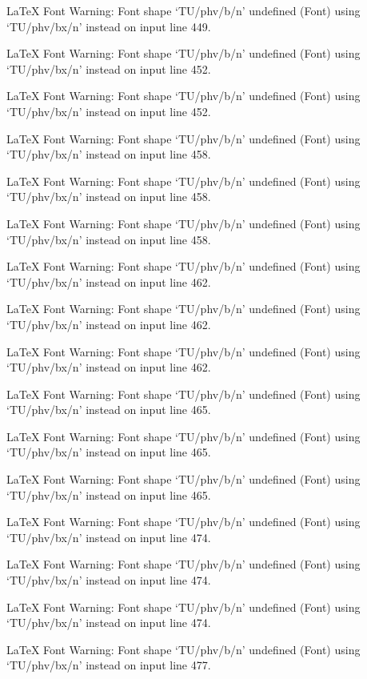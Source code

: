 LaTeX Font Warning: Font shape `TU/phv/b/n' undefined
(Font)              using `TU/phv/bx/n' instead on input line 449.


LaTeX Font Warning: Font shape `TU/phv/b/n' undefined
(Font)              using `TU/phv/bx/n' instead on input line 452.


LaTeX Font Warning: Font shape `TU/phv/b/n' undefined
(Font)              using `TU/phv/bx/n' instead on input line 452.


LaTeX Font Warning: Font shape `TU/phv/b/n' undefined
(Font)              using `TU/phv/bx/n' instead on input line 458.


LaTeX Font Warning: Font shape `TU/phv/b/n' undefined
(Font)              using `TU/phv/bx/n' instead on input line 458.


LaTeX Font Warning: Font shape `TU/phv/b/n' undefined
(Font)              using `TU/phv/bx/n' instead on input line 458.


LaTeX Font Warning: Font shape `TU/phv/b/n' undefined
(Font)              using `TU/phv/bx/n' instead on input line 462.


LaTeX Font Warning: Font shape `TU/phv/b/n' undefined
(Font)              using `TU/phv/bx/n' instead on input line 462.


LaTeX Font Warning: Font shape `TU/phv/b/n' undefined
(Font)              using `TU/phv/bx/n' instead on input line 462.


LaTeX Font Warning: Font shape `TU/phv/b/n' undefined
(Font)              using `TU/phv/bx/n' instead on input line 465.


LaTeX Font Warning: Font shape `TU/phv/b/n' undefined
(Font)              using `TU/phv/bx/n' instead on input line 465.


LaTeX Font Warning: Font shape `TU/phv/b/n' undefined
(Font)              using `TU/phv/bx/n' instead on input line 465.


LaTeX Font Warning: Font shape `TU/phv/b/n' undefined
(Font)              using `TU/phv/bx/n' instead on input line 474.


LaTeX Font Warning: Font shape `TU/phv/b/n' undefined
(Font)              using `TU/phv/bx/n' instead on input line 474.


LaTeX Font Warning: Font shape `TU/phv/b/n' undefined
(Font)              using `TU/phv/bx/n' instead on input line 474.


LaTeX Font Warning: Font shape `TU/phv/b/n' undefined
(Font)              using `TU/phv/bx/n' instead on input line 477.


